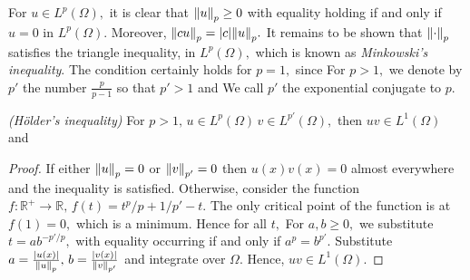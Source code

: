 For $u\in L^p(\Omega),$ it is clear that $\norm{u}_p\geq0$ with equality holding if and only if $u=0$ in $L^p(\Omega).$ Moreover, $\norm{cu}_p=\abs{c}\norm{u}_p.$ It remains to be shown that $\norm{\cdot}_p$ satisfies the triangle inequality, in $L^p(\Omega),$ which is known as \textit{Minkowski's inequality}. The condition certainly holds for $p=1,$ since
For $p>1,$ we denote by $p'$ the number $\frac{p}{p-1}$ so that $p'>1$ and
We call $p'$ the exponential conjugate to $p.$

\begin{theorem}
    \textit{(H\"older's inequality)} For $p>1,\,u\in L^p(\Omega)\,v\in L^{p'}(\Omega),$ then $uv\in L^1(\Omega)$ and
\end{theorem}
\begin{proof}
    If either $\norm{u}_{p}=0$ or $\norm{v}_{p'}=0$ then $u(x)v(x)=0$ almost everywhere and the inequality is satisfied. Otherwise, consider the function $f:\mathbb{R}^+\rightarrow\mathbb{R},\,f(t)=t^p/p+1/p'-t.$ The only critical point of the function is at $f(1)=0,$ which is a minimum. Hence for all $t,$
    For $a,b\geq0,$ we substitute $t=ab^{-p'/p},$
    with equality occurring if and only if $a^p=b^{p'}.$ Substitute $a=\frac{\abs{u(x)}}{\norm{u}_{p}},\,b=\frac{\abs{v(x)}}{\norm{v}_{p'}}$ and integrate over $\Omega.$
    Hence, $uv\in L^1(\Omega).$
\end{proof}
